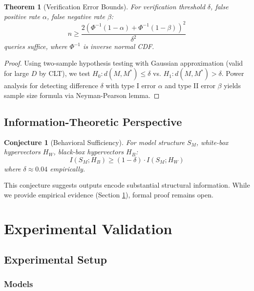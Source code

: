\documentclass[11pt,a4paper]{article}
\newtheorem{theorem}{Theorem}
\newtheorem{conjecture}{Conjecture}
\begin{document}
\begin{theorem}[Verification Error Bounds]
For verification threshold $\delta$, false positive rate $\alpha$, false negative rate $\beta$:
\begin{equation}
n \geq \frac{2(\Phi^{-1}(1-\alpha) + \Phi^{-1}(1-\beta))^2}{\delta^2}
\end{equation}
queries suffice, where $\Phi^{-1}$ is inverse normal CDF.
\end{theorem}

\begin{proof}
Using two-sample hypothesis testing with Gaussian approximation (valid for large $D$ by CLT), we test $H_0: d(M, M^*) \leq \delta$ vs. $H_1: d(M, M^*) > \delta$. Power analysis for detecting difference $\delta$ with type I error $\alpha$ and type II error $\beta$ yields sample size formula via Neyman-Pearson lemma.
\end{proof}

\subsection{Information-Theoretic Perspective}

\begin{conjecture}[Behavioral Sufficiency]
For model structure $S_M$, white-box hypervectors $H_W$, black-box hypervectors $H_B$:
\begin{equation}
I(S_M; H_B) \geq (1-\delta) \cdot I(S_M; H_W)
\end{equation}
where $\delta \approx 0.04$ empirically.
\end{conjecture}

This conjecture suggests outputs encode substantial structural information. While we provide empirical evidence (Section \ref{sec:experiments}), formal proof remains open.

\section{Experimental Validation}
\label{sec:experiments}

\subsection{Experimental Setup}

\subsubsection{Models}
\end{document}
